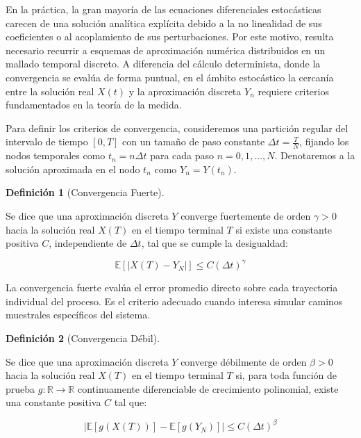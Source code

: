 \documentclass[
  spanish,
  letterpaper,
  DIV=11,
  numbers=noendperiod]{scrreprt}
\theoremstyle{plain}
\theoremstyle{definition}
\newtheorem{definition}{Definición}[chapter]
\theoremstyle{remark}
\begin{document}
En la práctica, la gran mayoría de las ecuaciones diferenciales
estocásticas carecen de una solución analítica explícita debido a la no
linealidad de sus coeficientes o al acoplamiento de sus perturbaciones.
Por este motivo, resulta necesario recurrir a esquemas de aproximación
numérica distribuidos en un mallado temporal discreto. A diferencia del
cálculo determinista, donde la convergencia se evalúa de forma puntual,
en el ámbito estocástico la cercanía entre la solución real \(X(t)\) y
la aproximación discreta \(Y_n\) requiere criterios fundamentados en la
teoría de la medida.

Para definir los criterios de convergencia, consideremos una partición
regular del intervalo de tiempo \([0, T]\) con un tamaño de paso
constante \(\Delta t = \frac{T}{N}\), fijando los nodos temporales como
\(t_n = n \Delta t\) para cada paso \(n = 0, 1, \dots, N\). Denotaremos
a la solución aproximada en el nodo \(t_n\) como \(Y_n = Y(t_n)\).

\begin{definition}[Convergencia
Fuerte]\protect\hypertarget{def-convergencia-fuerte}{}\label{def-convergencia-fuerte}

Se dice que una aproximación discreta \(Y\) converge fuertemente de
orden \(\gamma > 0\) hacia la solución real \(X(T)\) en el tiempo
terminal \(T\) si existe una constante positiva \(C\), independiente de
\(\Delta t\), tal que se cumple la desigualdad:

\[
\mathbb{E}\left[|X(T) - Y_N|\right] \le C (\Delta t)^\gamma
\]

\end{definition}

La convergencia fuerte evalúa el error promedio directo sobre cada
trayectoria individual del proceso. Es el criterio adecuado cuando
interesa simular caminos muestrales específicos del sistema.

\begin{definition}[Convergencia
Débil]\protect\hypertarget{def-convergencia-debil}{}\label{def-convergencia-debil}

Se dice que una aproximación discreta \(Y\) converge débilmente de orden
\(\beta > 0\) hacia la solución real \(X(T)\) en el tiempo terminal
\(T\) si, para toda función de prueba \(g: \mathbb{R} \to \mathbb{R}\)
continuamente diferenciable de crecimiento polinomial, existe una
constante positiva \(C\) tal que:

\[
|\mathbb{E}[g(X(T))] - \mathbb{E}[g(Y_N)]| \le C (\Delta t)^\beta
\]

\end{definition}
\end{document}
